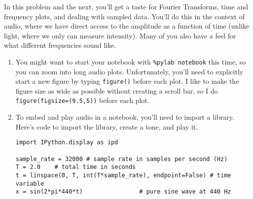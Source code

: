 \documentclass[11pt]{hmcpset}
\begin{document}
\begin{problem}
	In this problem and the next, you'll get a taste for Fourier Transforms, time and frequency plots, and dealing with sampled data. You'll do this in the context of audio, where we have direct access to the amplitude as a function of time (unlike light, where we only can measure intensity). Many of you also have a feel for what different frequencies sound like.
	\begin{enumerate}
		\item You might want to start your notebook with \texttt{\%pylab notebook} this time, so you can zoom into long audio plots. Unfortunately, you'll need to explicitly start a new figure by typing \texttt{figure()} before each plot. I like to make the figure size as wide as possible without creating a scroll bar, so I do \texttt{figure(figsize=(9.5,5))} before each plot.
		\item To embed and play audio in a notebook, you'll need to import a library. Here's code to import the library, create a tone, and play it.
\begin{lstlisting}[style=Python]
import IPython.display as ipd

sample_rate = 32000 # sample rate in samples per second (Hz)
T = 2.0    # total time in seconds
t = linspace(0, T, int(T*sample_rate), endpoint=False) # time variable
x = sin(2*pi*440*t)                # pure sine wave at 440 Hz


\end{lstlisting}
\end{enumerate}
\end{problem}
\end{document}
